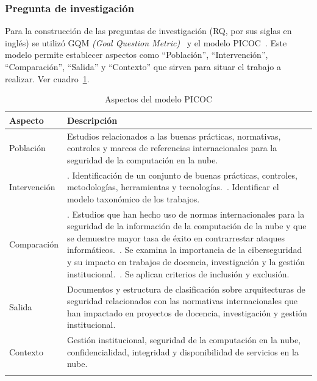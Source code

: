 \subsubsection{Pregunta de investigación}
Para la construcción de las preguntas de investigación (RQ, por sus siglas en inglés) se utilizó GQM \textit{(Goal Question Metric)}~\cite{Needleman2002} y el modelo PICOC~\cite{petticrew2008systematic}.
Este modelo permite establecer aspectos como ``Población'', ``Intervención'', ``Comparación'', ``Salida'' y ``Contexto'' que sirven para situar el trabajo a realizar.
Ver cuadro~\ref{tab:PICOC}.


\begin{table}[tbp]
    \scriptsize %
    \centering
    \renewcommand{\arraystretch}{1.0}
    \begin{tabularx}{\columnwidth}{>{\centering\arraybackslash}m{} >{\raggedright\arraybackslash}X}
        \hline
        \textbf{Aspecto} & \textbf{Descripción} \\
        \hline
        Población & Estudios relacionados a las buenas prácticas, normativas, controles y marcos de referencias internacionales para la seguridad de la computación en la nube. \\
        Intervención &
        1. Identificación de un conjunto de buenas prácticas, controles, metodologías, herramientas y tecnologías.~\newline
        2. Identificar el modelo taxonómico de los trabajos. \\
        Comparación &
        1. Estudios que han hecho uso de normas internacionales para la seguridad de la información de la computación de la nube y que se demuestre mayor tasa de éxito en contrarrestar ataques informáticos.~\newline
        2. Se examina la importancia de la ciberseguridad y su impacto en trabajos de docencia, investigación y la gestión institucional.~\newline
        3. Se aplican criterios de inclusión y exclusión. \\
        Salida & Documentos y estructura de clasificación sobre arquitecturas de seguridad relacionados con las normativas internacionales que han impactado en proyectos de docencia, investigación y gestión institucional. \\
        Contexto & Gestión institucional, seguridad de la computación en la nube, confidencialidad, integridad y disponibilidad de servicios en la nube. \\
        \hline
        \vspace{1pt}
    \end{tabularx}
    \caption{Aspectos del modelo PICOC}\label{tab:PICOC}
\end{table}

